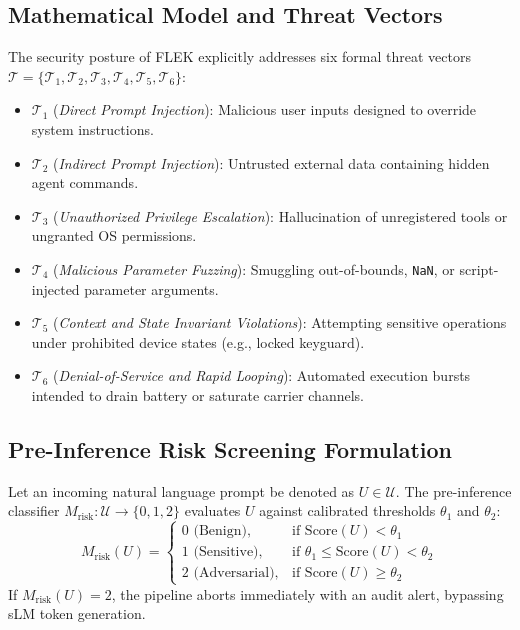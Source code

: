 \subsection{Mathematical Model and Threat Vectors}
The security posture of FLEK explicitly addresses six formal threat vectors $\mathcal{T} = \{\mathcal{T}_1, \mathcal{T}_2, \mathcal{T}_3, \mathcal{T}_4, \mathcal{T}_5, \mathcal{T}_6\}$:
\begin{itemize}
    \item $\mathcal{T}_1$ (\textit{Direct Prompt Injection}): Malicious user inputs designed to override system instructions.
    \item $\mathcal{T}_2$ (\textit{Indirect Prompt Injection}): Untrusted external data containing hidden agent commands.
    \item $\mathcal{T}_3$ (\textit{Unauthorized Privilege Escalation}): Hallucination of unregistered tools or ungranted OS permissions.
    \item $\mathcal{T}_4$ (\textit{Malicious Parameter Fuzzing}): Smuggling out-of-bounds, \texttt{NaN}, or script-injected parameter arguments.
    \item $\mathcal{T}_5$ (\textit{Context and State Invariant Violations}): Attempting sensitive operations under prohibited device states (e.g., locked keyguard).
    \item $\mathcal{T}_6$ (\textit{Denial-of-Service and Rapid Looping}): Automated execution bursts intended to drain battery or saturate carrier channels.
\end{itemize}

\subsection{Pre-Inference Risk Screening Formulation}
Let an incoming natural language prompt be denoted as $U \in \mathcal{U}$. The pre-inference classifier $M_{\text{risk}}: \mathcal{U} \to \{0, 1, 2\}$ evaluates $U$ against calibrated thresholds $\theta_1$ and $\theta_2$:
\begin{equation}
M_{\text{risk}}(U) = 
\begin{cases}
0 \text{ (Benign)}, & \text{if } \text{Score}(U) < \theta_1 \\
1 \text{ (Sensitive)}, & \text{if } \theta_1 \le \text{Score}(U) < \theta_2 \\
2 \text{ (Adversarial)}, & \text{if } \text{Score}(U) \ge \theta_2
\end{cases}
\end{equation}
If $M_{\text{risk}}(U) = 2$, the pipeline aborts immediately with an audit alert, bypassing sLM token generation.

